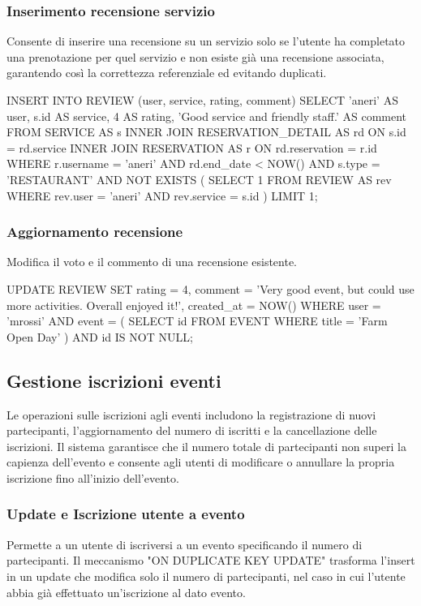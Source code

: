 \documentclass[a4paper,12pt]{report}
\begin{document}
\subsubsection{Inserimento recensione servizio}
Consente di inserire una recensione su un servizio solo se l'utente
ha completato una prenotazione per quel servizio e non esiste già una
recensione associata, garantendo così la correttezza referenziale ed
evitando duplicati.

\begin{sqlcode}[caption={}]
INSERT INTO REVIEW (user, service, rating, comment)
SELECT
  'aneri' AS user,
  s.id AS service,
  4 AS rating,
  'Good service and friendly staff.' AS comment
FROM SERVICE AS s
INNER JOIN RESERVATION_DETAIL AS rd ON s.id = rd.service
INNER JOIN RESERVATION AS r ON rd.reservation = r.id
WHERE
  r.username = 'aneri'
  AND rd.end_date < NOW()
  AND s.type = 'RESTAURANT'
  AND NOT EXISTS (
    SELECT 1
    FROM REVIEW AS rev
    WHERE rev.user = 'aneri' AND rev.service = s.id
  )
LIMIT 1;
\end{sqlcode}

\subsubsection{Aggiornamento recensione}
Modifica il voto e il commento di una recensione esistente.

\begin{sqlcode}[caption={}]
UPDATE REVIEW
SET
  rating = 4,
  comment = 'Very good event, but could use more activities. Overall enjoyed it!',
  created_at = NOW()
WHERE
  user = 'mrossi'
    AND event = (
    SELECT id
    FROM EVENT
    WHERE title = 'Farm Open Day'
    )
  AND id IS NOT NULL;
\end{sqlcode}

\subsection{Gestione iscrizioni eventi}
Le operazioni sulle iscrizioni agli eventi includono la registrazione
di nuovi partecipanti, l'aggiornamento del numero di iscritti e la
cancellazione delle iscrizioni. Il sistema garantisce che il numero
totale di partecipanti non superi la capienza dell'evento e consente
agli utenti di modificare o annullare la propria iscrizione fino
all'inizio dell'evento.

\subsubsection{Update e Iscrizione utente a evento}
Permette a un utente di iscriversi a un evento specificando il numero
di partecipanti. Il meccanismo "ON DUPLICATE KEY UPDATE" trasforma
l'insert in un update che modifica solo il numero di partecipanti,
nel caso in cui l'utente abbia già effettuato un'iscrizione al dato evento.
\end{document}
